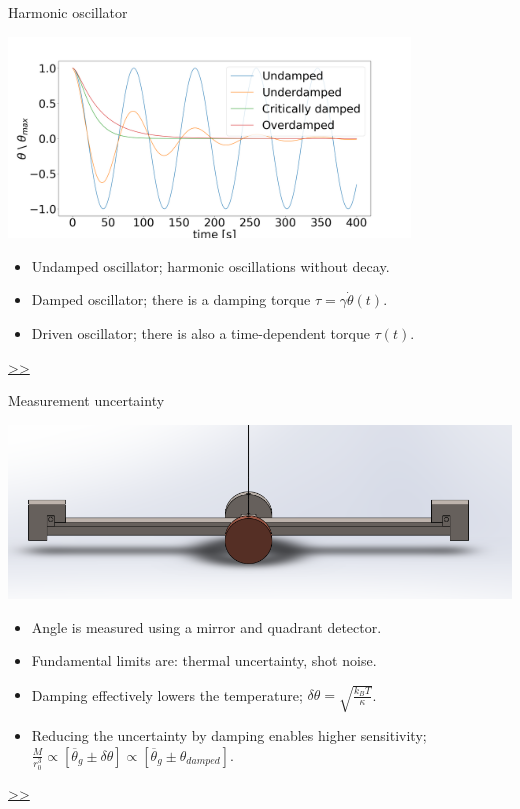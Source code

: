 \documentclass{beamer}
\begin{document}
\begin{frame}{\hypertarget{frame:Harmonic oscillator}{Harmonic oscillator}}
	\begin{center}		
		\includegraphics[width=0.8\textwidth,keepaspectratio]{damp.png}
    \end{center}
	\begin{itemize}

		\item Undamped oscillator; harmonic oscillations without decay.
		\item Damped oscillator; there is a damping torque $\tau = \gamma\dot{\theta}(t)$.
		\item Driven oscillator; there is also a time-dependent torque $\tau(t)$.
		
	\end{itemize}
	\hyperlink{frame:Damped oscillator}{>>}
\end{frame}


\begin{frame}{\hypertarget{frame:Measurement uncertainty}{Measurement uncertainty}}
	\begin{center}		
		\includegraphics[width=1\textwidth,keepaspectratio]{pendulum_front.png}
    \end{center}
	\begin{itemize}
		
		\item Angle is measured using a mirror and quadrant detector.
		\item Fundamental limits are: thermal uncertainty, shot noise. 
		\item Damping effectively lowers the temperature; $\delta\theta = \sqrt{\frac{k_B T}{\kappa}}$. 
		\item Reducing the uncertainty by damping enables higher sensitivity; $\frac{M}{r_0^3} \propto [\overline{\theta}_g\pm \delta\theta] \propto [\overline{\theta}_g\pm \theta_{damped}]$.

		
	\end{itemize}
	\hyperlink{frame:Measurement uncertainty 1}{>>} 
\end{frame}
\end{document}
